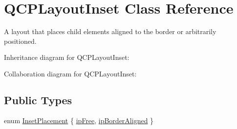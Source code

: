 \hypertarget{classQCPLayoutInset}{}\section{Q\+C\+P\+Layout\+Inset Class Reference}
\label{classQCPLayoutInset}


A layout that places child elements aligned to the border or arbitrarily positioned.  




Inheritance diagram for Q\+C\+P\+Layout\+Inset\+:


Collaboration diagram for Q\+C\+P\+Layout\+Inset\+:
\subsection*{Public Types}
\begin{DoxyCompactItemize}
\item 
enum \hyperlink{classQCPLayoutInset_a8b9e17d9a2768293d2a7d72f5e298192}{Inset\+Placement} \{ \hyperlink{classQCPLayoutInset_a8b9e17d9a2768293d2a7d72f5e298192aa4802986ea2cea457f932b115acba59e}{ip\+Free}, 
\hyperlink{classQCPLayoutInset_a8b9e17d9a2768293d2a7d72f5e298192aa81e7df4a785ddee2229a8f47c46e817}{ip\+Border\+Aligned}
 \}
\end{DoxyCompactItemize}
